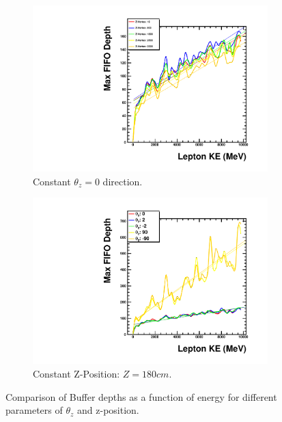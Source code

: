 \begin{figure}
\centering
\begin{subfigure}{.5\textwidth}
  \centering
  \includegraphics[width=\textwidth]{images/Const_Theta0_ASIC_lepKE_multigraph_pdg12_fhc.pdf}
  \caption{Constant $\theta_{z} = 0$ direction.}
\end{subfigure}%
\begin{subfigure}{.5\textwidth}
  \centering
  \includegraphics[width=\textwidth]{images/Const_Z180_ASIC_lepKE_multigraph_pdg12_fhc.pdf}
  \caption{Constant Z-Position: $Z = 180\unit{cm}$.}
\end{subfigure}
\caption{Comparison of Buffer depths as a function of energy for different parameters of $\theta_{z}$ and z-position.}
\label{fig:example_asic_energy_comparison}
\end{figure}